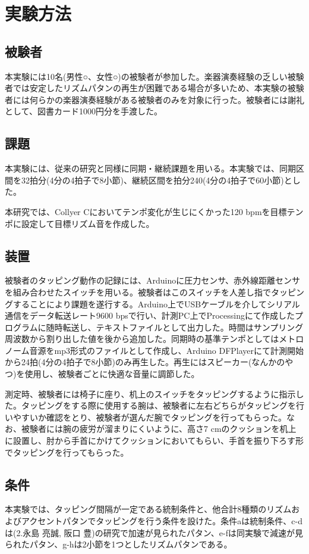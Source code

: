 \documentclass[twocolumn,10pt]{jarticle}
\begin{document}
\section{実験方法}
\subsection{被験者}
本実験には10名(男性○、女性○)の被験者が参加した。楽器演奏経験の乏しい被験者では安定したリズムパタンの再生が困難である場合が多いため、本実験の被験者には何らかの楽器演奏経験がある被験者のみを対象に行った。被験者には謝礼として、図書カード1000円分を手渡した。

\subsection{課題}
本実験には、従来の研究と同様に同期・継続課題を用いる。本実験では、同期区間を32拍分(4分の4拍子で8小節)、継続区間を拍分240(4分の4拍子で60小節)とした。

本研究では、Collyer C\cite{Collyer}においてテンポ変化が生じにくかった120 bpmを目標テンポに設定して目標リズム音を作成した。

\subsection{装置}
被験者のタッピング動作の記録には、Arduinoに圧力センサ、赤外線距離センサを組み合わせたスイッチを用いる。被験者はこのスイッチを人差し指でタッピングすることにより課題を遂行する。Arduino上でUSBケーブルを介してシリアル通信をデータ転送レート9600 bpsで行い、計測PC上でProcessingにて作成したプログラムに随時転送し、テキストファイルとして出力した。時間はサンプリング周波数から割り出した値を後から追加した。同期時の基準テンポとしてはメトロノーム音源をmp3形式のファイルとして作成し、Arduino DFPlayerにて計測開始から24拍(4分の4拍子で8小節)のみ再生した。再生にはスピーカー(なんかのやつ)を使用し、被験者ごとに快適な音量に調節した。

測定時、被験者には椅子に座り、机上のスイッチをタッピングするように指示した。タッピングをする際に使用する腕は、被験者に左右どちらがタッピングを行いやすいか確認をとり、被験者が選んだ腕でタッピングを行ってもらった。なお、被験者には腕の疲労が溜まりにくいように、高さ7 cmのクッションを机上に設置し、肘から手首にかけてクッションにおいてもらい、手首を振り下ろす形でタッピングを行ってもらった。

\subsection{条件}
本実験では、タッピング間隔が一定である統制条件と、他合計8種類のリズムおよびアクセントパタンでタッピングを行う条件を設けた。条件aは統制条件、c-dは(2.永島 亮誠, 阪口 豊)の研究で加速が見られたパタン、e-fは同実験で減速が見られたパタン、g-hは2小節を1つとしたリズムパタンである。
\end{document}
